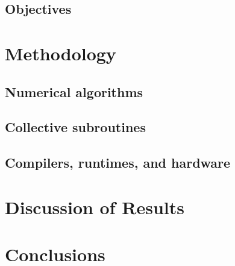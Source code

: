 \subsection{Objectives}

\section{Methodology}
\subsection{Numerical algorithms}
\subsection{Collective subroutines}
\subsection{Compilers, runtimes, and hardware}

\section{Discussion of Results}

\section{Conclusions}





